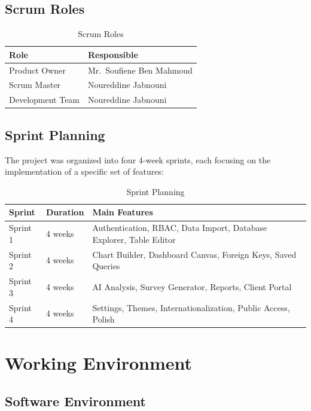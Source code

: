 \documentclass[12pt,a4paper]{report}
\begin{document}
\subsection{Scrum Roles}

\begin{table}[H]
\centering
\begin{tabular}{|l|l|}
\hline
\textbf{Role} & \textbf{Responsible} \\
\hline
Product Owner & Mr.~Soufiene Ben Mahmoud \\
Scrum Master & Noureddine Jabnouni \\
Development Team & Noureddine Jabnouni \\
\hline
\end{tabular}
\caption{Scrum Roles}
\end{table}

\subsection{Sprint Planning}

The project was organized into four 4-week sprints, each focusing on the implementation of a specific set of features:

\begin{table}[H]
\centering
\begin{tabular}{|l|l|p{8cm}|}
\hline
\textbf{Sprint} & \textbf{Duration} & \textbf{Main Features} \\
\hline
Sprint 1 & 4 weeks & Authentication, RBAC, Data Import, Database Explorer, Table Editor \\
Sprint 2 & 4 weeks & Chart Builder, Dashboard Canvas, Foreign Keys, Saved Queries \\
Sprint 3 & 4 weeks & AI Analysis, Survey Generator, Reports, Client Portal \\
Sprint 4 & 4 weeks & Settings, Themes, Internationalization, Public Access, Polish \\
\hline
\end{tabular}
\caption{Sprint Planning}
\end{table}

\section{Working Environment}

\subsection{Software Environment}
\end{document}
